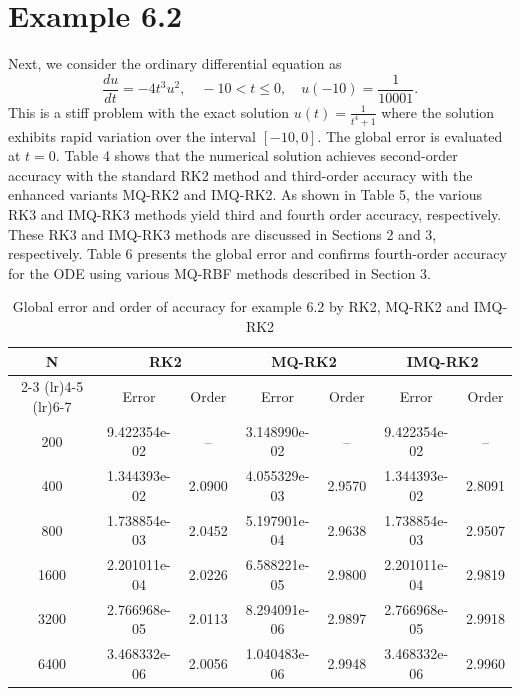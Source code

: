 \documentclass[a4paper, preprint,11pt]{elsarticle}
\numberwithin{equation}{section}
\begin{document}
\section*{Example 6.2}
Next, we consider the ordinary differential equation  as
\begin{equation*}
    \frac{du}{dt} = -4t^3 u^2, \quad -10 < t \leq 0, \quad u(-10) = \frac{1}{10001}.
\end{equation*}
This is a stiff problem with the exact solution $u(t) = \frac{1}{t^4+1}$
where the solution exhibits rapid variation over the interval $[-10, 0]$. The global error is evaluated at $t = 0$. Table 4 shows that the numerical solution achieves second-order accuracy with the standard RK2 method and third-order accuracy with the enhanced variants MQ-RK2 and IMQ-RK2. As shown in Table 5, the various RK3 and IMQ-RK3 methods yield third and fourth order accuracy, respectively. These RK3 and IMQ-RK3 methods are discussed in Sections 2 and 3, respectively. Table 6 presents the global error and confirms fourth-order accuracy for the ODE using various MQ-RBF methods described in Section 3.
\begin{table}[htbp!]
    \centering
    \caption{Global error and order of accuracy for example 6.2 by RK2, MQ-RK2 and IMQ-RK2}
    \begin{tabular}{c c c c c c c}
        \toprule
        N & \multicolumn{2}{c}{RK2} & \multicolumn{2}{c}{MQ-RK2} & \multicolumn{2}{c}{IMQ-RK2} \\
        \cmidrule(lr){2-3} \cmidrule(lr){4-5} \cmidrule(lr){6-7}
          & Error & Order & Error & Order & Error & Order \\
        \midrule
        200  &  9.422354e-02    & -- & 3.148990e-02  & --  & 9.422354e-02   & --    \\
        400  & 1.344393e-02  & 2.0900 & 4.055329e-03 & 2.9570 & 1.344393e-02  & 2.8091 \\
        800  &  1.738854e-03  & 2.0452 & 5.197901e-04 &2.9638
 & 1.738854e-03 & 2.9507\\
        1600  & 2.201011e-04  & 2.0226 & 6.588221e-05 & 2.9800 & 2.201011e-04   & 2.9819\\
        3200 &  2.766968e-05 & 2.0113 &8.294091e-06  & 2.9897 & 2.766968e-05    & 2.9918 \\
        6400 &3.468332e-06 & 2.0056 & 1.040483e-06 &2.9948 & 3.468332e-06 & 2.9960\\
        \bottomrule
    \end{tabular}
\end{table}
\end{document}
